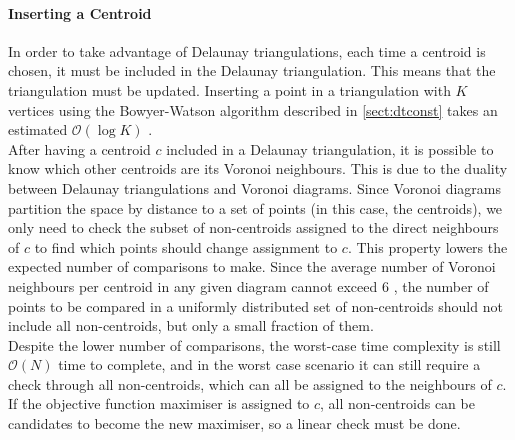 \paragraph{Inserting a Centroid}
In order to take advantage of Delaunay triangulations, each time a centroid is chosen, it must be included in the Delaunay triangulation. This means that the triangulation must be updated. Inserting a point in a triangulation with $K$ vertices using the Bowyer-Watson algorithm described in \ref{sect:dtconst} takes an estimated $\mathcal{O}(\log{K})$ \cite{tricomplex}.\\
After having a centroid $c$ included in a Delaunay triangulation, it is possible to know which other centroids are its Voronoi neighbours. This is due to the duality between Delaunay triangulations and Voronoi diagrams.
Since Voronoi diagrams partition the space by distance to a set of points (in this case, the centroids), we only need to check the subset of non-centroids assigned to the direct neighbours of $c$ to find which points should change assignment to $c$. 
This property lowers the expected number of comparisons to make. Since the average number of Voronoi neighbours per centroid in any given diagram cannot exceed 6 \cite{tricard}, the number of points to be compared in a uniformly distributed set of non-centroids should not include all non-centroids, but only a small fraction of them.\\
Despite the lower number of comparisons, the worst-case time complexity is still $\mathcal{O}(N)$ time to complete, and in the worst case scenario it can still require a check through all non-centroids, which can all be assigned to the neighbours of $c$.\\
If the objective function maximiser is assigned to $c$, all non-centroids can be candidates to become the new maximiser, so a linear check must be done.


